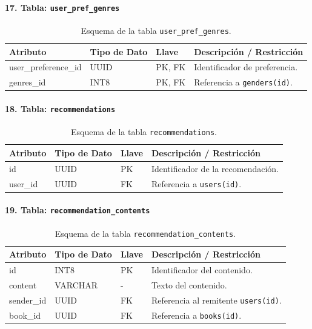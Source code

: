 \documentclass[12pt, atypical, journal]{article}
\begin{document}
\paragraph{17. Tabla: \texttt{user\_pref\_genres}}
\begin{table}[H]
	\centering
	\begin{tabular}{|l|l|l|p{6.5cm}|}
		\hline
		\textbf{Atributo} & \textbf{Tipo de Dato} & \textbf{Llave} & \textbf{Descripción / Restricción} \\ \hline
		user\_preference\_id & UUID & PK, FK & Identificador de preferencia. \\ \hline
		genres\_id & INT8 & PK, FK & Referencia a \texttt{genders(id)}. \\ \hline
	\end{tabular}
	\caption{Esquema de la tabla \texttt{user\_pref\_genres}.}
\end{table}

\paragraph{18. Tabla: \texttt{recommendations}}
\begin{table}[H]
	\centering
	\begin{tabular}{|l|l|l|p{6.5cm}|}
		\hline
		\textbf{Atributo} & \textbf{Tipo de Dato} & \textbf{Llave} & \textbf{Descripción / Restricción} \\ \hline
		id & UUID & PK & Identificador de la recomendación. \\ \hline
		user\_id & UUID & FK & Referencia a \texttt{users(id)}. \\ \hline
	\end{tabular}
	\caption{Esquema de la tabla \texttt{recommendations}.}
\end{table}

\paragraph{19. Tabla: \texttt{recommendation\_contents}}
\begin{table}[H]
	\centering
	\begin{tabular}{|l|l|l|p{6.5cm}|}
		\hline
		\textbf{Atributo} & \textbf{Tipo de Dato} & \textbf{Llave} & \textbf{Descripción / Restricción} \\ \hline
		id & INT8 & PK & Identificador del contenido. \\ \hline
		content & VARCHAR & - & Texto del contenido. \\ \hline
		sender\_id & UUID & FK & Referencia al remitente \texttt{users(id)}. \\ \hline
		book\_id & UUID & FK & Referencia a \texttt{books(id)}. \\ \hline
	\end{tabular}
	\caption{Esquema de la tabla \texttt{recommendation\_contents}.}
\end{table}
\end{document}
